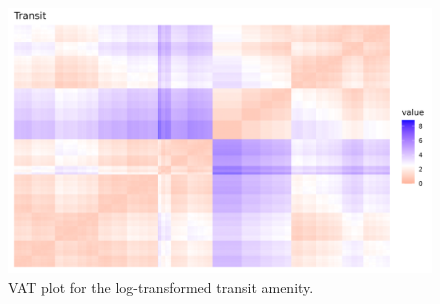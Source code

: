 \documentclass[11pt, a4paper]{article}
\begin{document}
{\begin{figure}[H]
\centering
\includegraphics[width=\textwidth]{./vat/transit_vat_log.png}
\caption[Transit VAT plot]{VAT plot for the log-transformed transit amenity.}\label{transitvat}
\end{figure}

} %










\end{document}

